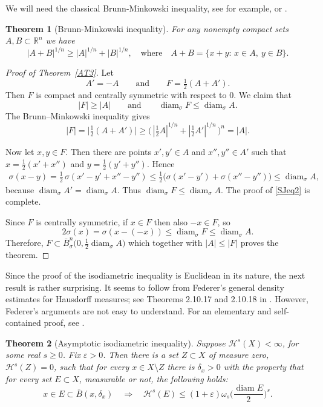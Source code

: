 \documentclass[12pt,leqno]{amsart}
\newtheorem{theorem}{Theorem}
\theoremstyle{definition}
\newcommand{\bbbr}{\mathbb R}
\newcommand{\eps}{\varepsilon}
\def\diam{\operatorname{diam}}
\def\H{{\mathcal H}}
\numberwithin{theorem}{section} \numberwithin{equation}{section}
\begin{document}
We will need the classical Brunn-Minkowski inequality, see for example, \cite[Theorem~8.3.1]{buragoz} or \cite[Theorem~7.1.1 and p.\ 371]{schneider}.
\begin{theorem}[Brunn-Minkowski inequality]
\label{AT4}
For any nonempty compact sets $A,B\subset\bbbr^n$ we have
$$
|A+B|^{1/n}\geq |A|^{1/n}+|B|^{1/n},
\quad
\text{where}
\quad
A+B=\{x+y:\, x\in A,\ y\in B\}.
$$
\end{theorem}
\begin{proof}[Proof of Theorem~\ref{AT3}]
Let
\[
A'=-A
\qquad
\text{and}
\qquad
F=\tfrac{1}{2}(A+A').
\]
Then $F$ is compact and centrally symmetric with respect to $0$. We claim that
\begin{equation}
\label{SJeq2}
|F|\ge  |A|
\qquad
\text{and}
\qquad
\diam_\sigma F\le \diam_\sigma A.
\end{equation}
The Brunn--Minkowski inequality gives
\[
|F|=
\big|\tfrac{1}{2}(A+A')\big|
\ge
\big(\,|\tfrac{1}{2}A|^{1/n}
+
|\tfrac{1}{2}A'|^{1/n}\, \big)^n
=|A|.
\]

Now let $x,y\in F$. Then there are points $x',y'\in A$ and $x'',y''\in A'$ such that
$x=\tfrac{1}{2}(x'+x'')$ and $y=\tfrac{1}{2} (y'+y'')$. Hence
\begin{align*}
\sigma(x-y)
=\tfrac{1}{2}\,\sigma(x'-y'+x''-y'')
\le \tfrac{1}{2}\bigl(\sigma(x'-y')+\sigma(x''-y'')\bigr)
\le  \diam_\sigma A,
\end{align*}
because $\diam_\sigma A'=\diam_\sigma A$. Thus
$\diam_\sigma F\le \diam_\sigma A$. The proof of \eqref{SJeq2} is complete.

Since $F$ is centrally symmetric, if $x\in F$ then also $-x\in F$, so
\[
2\sigma(x)=\sigma(x-(-x))\le \diam_\sigma F\le \diam_\sigma A.
\]
Therefore,
$F\subset \bar{B}_\sigma^n\big(0,\tfrac{1}{2}\diam_\sigma A\big)$ which together with $|A|\leq |F|$ proves the theorem.
\end{proof}

Since the proof of the isodiametric inequality is Euclidean in its nature, the next result is rather surprising.
It seems to follow from Federer’s general density estimates for Hausdorff measures; see Theorems 2.10.17 and 2.10.18 in \cite{federer}. However, Federer’s arguments are not easy to understand. For an elementary and self-contained proof, see \cite[Lemma~2.14]{EH1}.
\begin{theorem}[Asymptotic isodiametric inequality]
\label{AT1}
Suppose $\H^s(X)<\infty$, for some real $s\geq 0$. Fix $\eps>0$.
Then there is a set $Z\subset X$ of measure zero, $\H^s(Z)=0$, such that for every $x\in X\setminus Z$ there is $\delta_x>0$ with the property that for every set $E\subset X$, measurable or not, the following holds:
$$
x\in E\subset \bar{B}(x,\delta_x)
\quad
\Longrightarrow
\quad
\H^s(E)\leq (1+\eps)\omega_s\Big(\frac{\diam E}{2}\Big)^s.
$$
\end{theorem}
\end{document}
